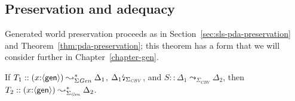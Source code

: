 
\subsection{Preservation and adequacy}
\label{sec:nat-ssos-adequacy-pres}

Generated world preservation proceeds as in
Section~\ref{sec:sls-pda-preservation} and
Theorem~\ref{thm:pda-preservation}; this theorem has a form that
we will consider further in Chapter~\ref{chapter-gen}.

\bigskip
\begin{theorem}[Preservation]\label{thm:adequate-pres}
  If $T_1 :: (x{:}\langle {\sf gen} \rangle) \leadsto^*_{\Sigma{\it Gen}} \Delta_1$,
  ${\Delta_1}{\mbox{\lightning}}_{\Sigma_{\it CBV}}$, and 
  $S :: \Delta_1 \leadsto_{\Sigma_{CBV}} \Delta_2$, then
  $T_2 :: (x{:}\langle {\sf gen} \rangle) \leadsto^*_{\Sigma_{\it Gen}} \Delta_2$.
\end{theorem}
\bigskip





